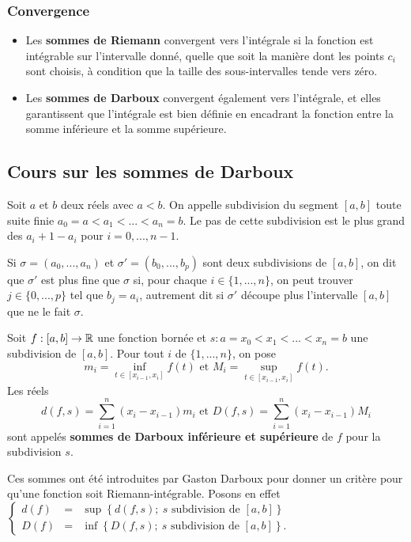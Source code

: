 \subsubsection{Convergence}

\begin{itemize}
    \item Les \textbf{sommes de Riemann} convergent vers l'intégrale si la fonction est intégrable sur l'intervalle donné, quelle que soit la manière dont les points $c_i$ sont choisis, à condition que la taille des sous-intervalles tende vers zéro.
    \item Les \textbf{sommes de Darboux} convergent également vers l'intégrale, et elles garantissent que l'intégrale est bien définie en encadrant la fonction entre la somme inférieure et la somme supérieure.
\end{itemize}

\subsection{Cours sur les sommes de Darboux}

Soit $a$ et $b$ deux réels avec $a<b$. On appelle subdivision du segment $[a,b]$ toute suite finie $a_0=a<a_1<...<a_n=b$. Le pas de cette subdivision est le plus grand des $a_i+1−a_i$ pour $i=0,...,n−1$.

\medskip

Si $\sigma=(a_0,...,a_n)$ et $\sigma′=(b_0,...,b_p)$ sont deux subdivisions de $[a,b]$, on dit que $\sigma′$ est plus fine que $\sigma$ si, pour chaque $i\in \{1,...,n\}$, on peut trouver $j\in \{0,...,p\}$ tel que $b_j=a_i$, autrement dit si $\sigma′$ découpe plus l'intervalle $[a,b]$ que ne le fait $\sigma$.
\ed

\bigskip

Soit $f:[a,b]\to \mathbb{R}$ une fonction bornée et $s:a=x_0<x_1<...<x_n=b$ une subdivision de $[a,b]$. Pour tout $i$ de $\{1,...,n \}$, on pose  
$$m_i=\inf_{t\in[x_{i-1},x_i]}f(t)\textrm{ et }M_i=\sup_{t\in[x_{i-1},x_i]}f(t).$$
Les réels 
$$d(f,s)=\sum_{i=1}^n (x_i-x_{i-1})m_i\textrm{ et }D(f,s)=\sum_{i=1}^n (x_i-x_{i-1})M_i$$
sont appelés \textbf{sommes de Darboux inférieure et supérieure} de $f$ pour la subdivision $s$.
\ed

Ces sommes ont été introduites par Gaston Darboux pour donner un critère pour qu'une fonction soit Riemann-intégrable. Posons en effet 
$\left\{
\begin{array}{rcl}
d(f)&=&\sup\left\{d(f,s);\ s\textrm{ subdivision de }[a,b]\right\}\\
D(f)&=&\inf\left\{D(f,s);\ s\textrm{ subdivision de }[a,b]\right\}.
\end{array}\right.$

